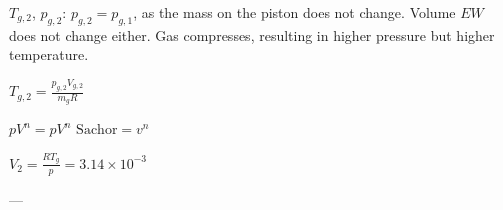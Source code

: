 \( T_{g,2} \), \( p_{g,2} \):  
\( p_{g,2} = p_{g,1} \), as the mass on the piston does not change.  
Volume \( EW \) does not change either. Gas compresses, resulting in higher pressure but higher temperature.  

\( T_{g,2} = \frac{p_{g,2} V_{g,2}}{m_g R} \)  

\( p V^n = p V^n \)  
\( \text{Sachor} = v^n \)  

\( V_2 = \frac{RT_g}{p} = 3.14 \times 10^{-3} \)  

---